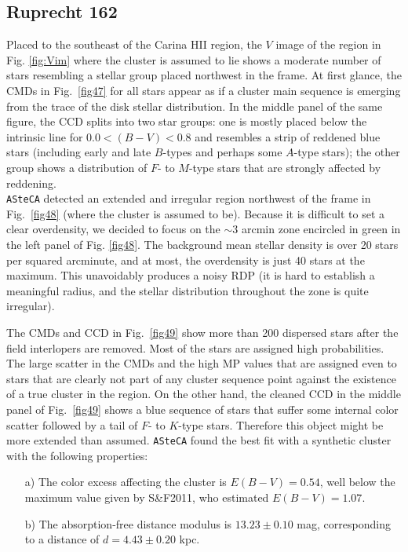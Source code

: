 \documentclass[draft]{aa}
\begin{document}
\subsection{Ruprecht 162}
\label{app:rup162}

Placed to the southeast of the Carina HII region, the $V$ image of the region
in Fig. \ref{fig:Vim} where the cluster is assumed to lie shows a moderate
number of stars resembling a stellar group placed northwest in the
frame. At first glance, the CMDs in Fig.~\ref{fig47} for all stars appear
as if a cluster main sequence is emerging from the trace of the disk stellar
distribution.
In the middle panel of the same figure, the CCD splits into two star groups: one is mostly placed below the intrinsic line for $0.0<(B-V)< 0.8$ and
resembles a strip of reddened blue stars (including early and late $B$-types
and perhaps some $A$-type stars); the other group shows a distribution of $F$-
to $M$-type stars that are strongly affected by reddening.\\

\texttt{ASteCA} detected an extended and irregular region northwest of
the frame in Fig.~\ref{fig48} (where the cluster is assumed to be). Because it is difficult to set a clear overdensity, we decided to focus on
the $\sim3$ arcmin zone encircled in green in the left panel of Fig. \ref{fig48}.
The background mean stellar density is over 20 stars per squared arcminute, and
at most, the overdensity is just 40 stars at the maximum. This unavoidably
produces a noisy RDP (it is hard to establish a meaningful radius, and the
stellar distribution throughout the zone is quite irregular).

The CMDs and CCD in Fig.~\ref{fig49}
show more than 200 dispersed stars after the field interlopers are removed.
Most of the stars are assigned high probabilities. The large scatter in the
CMDs and the high MP values that are assigned even
to stars that are clearly not part of any cluster sequence point against the
existence of a true cluster in the region.
On the other hand, the cleaned CCD in the middle panel of Fig.~\ref{fig49} shows a blue
sequence of stars that suffer some internal color scatter followed by a tail of
$F$- to $K$-type stars. Therefore this object might be more extended than
assumed. \texttt{ASteCA} found the best fit with a synthetic cluster with
the following properties:

\begin{itemize}
\item [a)] The color excess affecting the cluster is $E(B-V)=0.54$, well
below the maximum value given by S\&F2011, who estimated $E(B-V)=1.07$.
\item [b)] The absorption-free distance modulus is $13.23\pm0.10$ mag,
corresponding to a distance of $d=4.43\pm0.20$ kpc.
\end{itemize}
\end{document}
